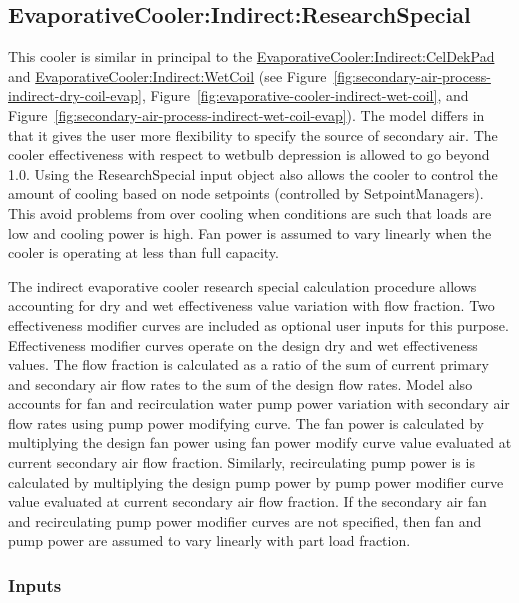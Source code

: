 \subsection{EvaporativeCooler:Indirect:ResearchSpecial}\label{evaporativecoolerindirectresearchspecial}

This cooler is similar in principal to the \hyperref[evaporativecoolerindirectceldekpad]{EvaporativeCooler:Indirect:CelDekPad} and \hyperref[evaporativecoolerindirectwetcoil]{EvaporativeCooler:Indirect:WetCoil} (see Figure~\ref{fig:secondary-air-process-indirect-dry-coil-evap}, Figure~\ref{fig:evaporative-cooler-indirect-wet-coil}, and Figure~\ref{fig:secondary-air-process-indirect-wet-coil-evap}). The model differs in that it gives the user more flexibility to specify the source of secondary air. The cooler effectiveness with respect to wetbulb depression is allowed to go beyond 1.0. Using the ResearchSpecial input object also allows the cooler to control the amount of cooling based on node setpoints (controlled by SetpointManagers). This avoid problems from over cooling when conditions are such that loads are low and cooling power is high. Fan power is assumed to vary linearly when the cooler is operating at less than full capacity.

The indirect evaporative cooler research special calculation procedure allows accounting for dry and wet effectiveness value variation with flow fraction. Two effectiveness modifier curves are included as optional user inputs for this purpose. Effectiveness modifier curves operate on the design dry and wet effectiveness values. The flow fraction is calculated as a ratio of the sum of current primary and secondary air flow rates to the sum of the design flow rates. Model also accounts for fan and recirculation water pump power variation with secondary air flow rates using pump power modifying curve. The fan power is calculated by multiplying the design fan power using fan power modify curve value evaluated at current secondary air flow fraction. Similarly, recirculating pump power is is calculated by multiplying the design pump power by pump power modifier curve value evaluated at current secondary air flow fraction. If the secondary air fan and recirculating pump power modifier curves are not specified, then fan and pump power are assumed to vary linearly with part load fraction.

\subsubsection{Inputs}\label{inputs-4-011}

